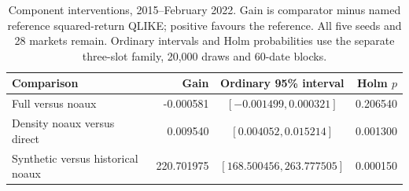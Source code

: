 \begin{table}[!htbp]\centering
\begingroup\small\setlength{\tabcolsep}{4pt}
\caption[Matched training-component interventions]{Component interventions, 2015--February 2022. Gain is comparator minus named reference squared-return QLIKE; positive favours the reference. All five seeds and 28 markets remain. Ordinary intervals and Holm probabilities use the separate three-slot family, 20,000 draws and 60-date blocks.}\label{tab:new-components}
\begin{tabular}{@{}>{\raggedright\arraybackslash}p{4.1cm}rcr@{}}
\toprule
Comparison & Gain & Ordinary 95\% interval & Holm $p$ \\
\midrule
Full versus noaux & -0.000581 & $[-0.001499,0.000321]$ & 0.206540 \\
Density noaux versus direct & 0.009540 & $[0.004052,0.015214]$ & 0.001300 \\
Synthetic versus historical noaux & 220.701975 & $[168.500456,263.777505]$ & 0.000150 \\
\bottomrule
\end{tabular}\endgroup\end{table}
